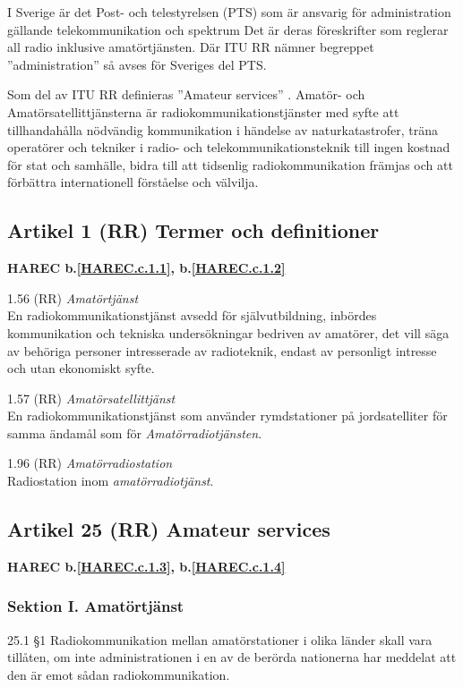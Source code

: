 \begin{multicols}{2}
I Sverige är det Post- och telestyrelsen (PTS) som är ansvarig för
administration gällande telekommunikation och spektrum Det är deras
föreskrifter som reglerar all radio inklusive amatörtjänsten.
Där ITU RR nämner begreppet ''administration'' så avses för Sveriges del PTS.

Som del av ITU RR definieras ''Amateur services'' \cite[Article 25]{ITU-RR}.
Amatör- och Amatörsatellittjänsterna är radiokommunikationstjänster
med syfte att tillhandahålla nödvändig kommunikation i händelse av
naturkatastrofer, träna operatörer och tekniker i radio- och
telekommunikationsteknik till ingen kostnad för stat och samhälle,
bidra till att tidsenlig radiokommunikation främjas och att förbättra
internationell förståelse och välvilja.

\subsection{Artikel 1 (RR) Termer och definitioner}
\textbf{
HAREC b.\ref{HAREC.c.1.1}\label{myHAREC.c.1.1},
 b.\ref{HAREC.c.1.2}\label{myHAREC.c.1.2}
}

1.56 (RR) \emph{Amatörtjänst} \cite[1.56]{ITU-RR}\\
En radiokommunikationstjänst avsedd för självutbildning, inbördes
kommunikation och tekniska undersökningar bedriven av amatörer, det
vill säga av behöriga personer intresserade av radioteknik,
endast av personligt intresse och utan ekonomiskt syfte.

1.57 (RR) \emph{Amatörsatellittjänst} \cite[1.57]{ITU-RR}\\
En radiokommunikationstjänst som använder rymdstationer på
jordsatelliter för samma ändamål som för \emph{Amatörradiotjänsten}.

1.96 (RR) \emph{Amatörradiostation} \cite[1.96]{ITU-RR}\\
Radiostation inom \emph{amatörradiotjänst}.

\subsection{Artikel 25 (RR) Amateur services}
\textbf{
HAREC b.\ref{HAREC.c.1.3}\label{myHAREC.c.1.3},
 b.\ref{HAREC.c.1.4}\label{myHAREC.c.1.4}
}

\subsubsection{Sektion I. Amatörtjänst}
25.1 \S1 Radiokommunikation mellan amatörstationer i olika länder
skall vara tillåten, om inte administrationen i en av de berörda
nationerna har meddelat att den är emot sådan radiokommunikation.
\cite[25.1]{ITU-RR}


\end{multicols}
